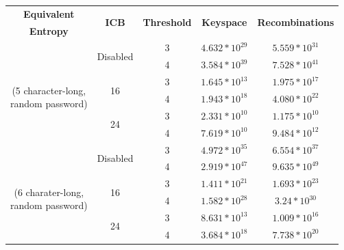 \begin{table}[t]
    \centering
    \begin{tabular}{ | c | c | c | c | c |}
        \hline
        {\bf Equivalent} & \multirow{2}{*}{{\bf ICB}} & \multirow{2}{*}{{\bf Threshold}} &
        \multirow{2}{*}{{\bf Keyspace}} & \multirow{2}{*}{{\bf Recombinations}} \\
        {\bf Entropy} & & & & \\
        \hline
        \multirow{6}{*}{\parbox[h]{1.8cm}{ \\(5 character-long,\\ random password)}}
        & \multirow{2}{*}{Disabled} & 3 & $4.632*10^{29}$ & $5.559*10^{31}$ \\ 
                                \cline{3-5}
                                &    & 4 & $3.584*10^{39}$ & $7.528*10^{41}$ \\
                                \cline{2-5}
                               & \multirow{2}{*}{16} & 3 & $1.645*10^{13}$ & $1.975*10^{17}$ \\
                                \cline{3-5}
                               &    & 4 & $1.943*10^{18}$ & $4.080*10^{22}$\\
                                \cline{2-5}
                               & \multirow{2}{*}{24} & 3 & $2.331*10^{10}$ & $1.175*10^{10}$\\ 
                                \cline{3-5}
                               &    & 4 & $7.619*10^{10}$ & $9.484*10^{12}$\\ 
        \hline
        \multirow{6}{*}{\parbox[h]{1.8cm}{\\(6 charater-long,\\ random password)}} 
        & \multirow{2}{*}{Disabled} & 3 & $4.972*10^{35}$& $6.554*10^{37}$ \\ 
                                \cline{3-5}
                                &    & 4 & $2.919*10^{47}$ & $9.635*10^{49}$ \\
                                \cline{2-5}
                                & \multirow{2}{*}{16} & 3 & $1.411*10^{21}$ & $1.693*10^{23}$ \\ 
                                \cline{3-5}
                                &    & 4 & $1.582*10^{28}$ & $3.24*10^{30}$ \\ 
                                \cline{2-5}
                                & \multirow{2}{*}{24} & 3 & $8.631*10^{13}$ & $1.009*10^{16}$ \\ 
                                \cline{3-5}
                                &    & 4 & $3.684*10^{18}$ & $7.738*10^{20}$ \\ 
                                \cline{2-5}


\end{tabular}
\end{table}
